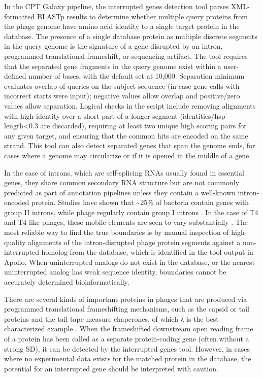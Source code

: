 In the CPT Galaxy pipeline, the interrupted genes detection tool parses
XML-formatted BLASTp results to determine whether multiple query
proteins from the phage genome have amino acid identity to a single
target protein in the database. The presence of a single database
protein as multiple discrete segments in the query genome is the
signature of a gene disrupted by an intron, programmed translational
frameshift, or sequencing artifact. The tool requires that the separated
gene fragments in the query genome exist within a user-defined number of
bases, with the default set at 10,000. Separation minimum evaluates
overlap of queries on the subject sequence (in case gene calls with
incorrect starts were input); negative values allow overlap and
positive/zero values allow separation. Logical checks in the script
include removing alignments with high identity over a short part of a
longer segment (identities/hsp length\textless0.3 are discarded),
requiring at least two unique high scoring pairs for any given target,
and ensuring that the common hits are encoded on the same strand. This
tool can also detect separated genes that span the genome ends, for
cases where a genome may circularize or if it is opened in the middle of
a gene.

In the case of introns, which are self-splicing RNAs usually found in
essential genes, they share common secondary RNA structure but are not
commonly predicted as part of annotation pipelines unless they contain a
well-known intron-encoded protein. Studies have shown that
\textasciitilde25\% of bacteria contain genes with group II introns,
while phage regularly contain group I introns \cite{Lambda,Candales_2011,Leclercq_2012}. In the case
of T4 and T4-like phages, these mobile elements are seen to vary
substantially \cite{Edgell_2010,Petrov_2006,Petrov_2010}. The most reliable way to find the true
boundaries is by manual inspection of high-quality alignments of the
intron-disrupted phage protein segments against a non-interrupted
homolog from the database, which is identified in the tool output in
Apollo. When uninterrupted analogs do not exist in the database, or the
nearest uninterrupted analog has weak sequence identity, boundaries
cannot be accurately determined bioinformatically.

There are several kinds of important proteins in phages that are
produced via programmed translational frameshifting mechanisms, such as
the capsid or tail proteins and the tail tape measure chaperones, of
which λ is the best characterized example \cite{Baranov_2006,Atkins_2016,Xu_2004,Garci_a_2004,Auzat_2008,Condron_1991}. When the
frameshifted downstream open reading frame of a protein has been called
as a separate protein-coding gene (often without a strong SD), it can be
detected by the interrupted genes tool. However, in cases where no
experimental data exists for the matched protein in the database, the
potential for an interrupted gene should be interpreted with caution.

